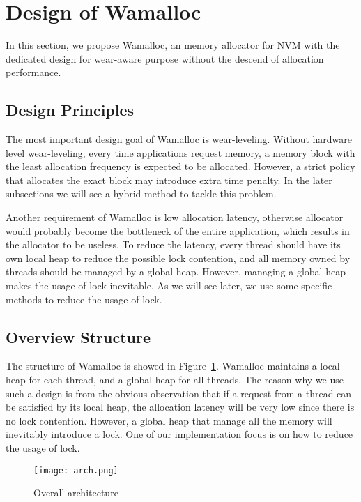 \documentclass[10pt, conference, compsocconf]{IEEEtran}
\begin{document}
\section{Design of Wamalloc}

In this section, we propose Wamalloc, 
an memory allocator for NVM with the dedicated design for wear-aware purpose 
without the descend of allocation performance.

\subsection{Design Principles}

The most important design goal of Wamalloc is wear-leveling. 
Without hardware level wear-leveling, every time applications request memory,
a memory block with the least allocation frequency is expected to be allocated.
However, a strict policy that allocates the exact block may introduce extra time penalty.
In the later subsections we will see a hybrid method to tackle this problem.

Another requirement of Wamalloc is low allocation latency,
otherwise allocator would probably become the bottleneck of the entire application,
which results in the allocator to be useless. 
To reduce the latency, every thread should have its own local heap to reduce the possible lock contention,
and all memory owned by threads should be managed by a global heap.
However, managing a global heap makes the usage of lock inevitable.
As we will see later, we use some specific methods to reduce the usage of lock.

\subsection{Overview Structure}

The structure of Wamalloc is showed in Figure~\ref{fig:arch}.
Wamalloc maintains a local heap for each thread, and a global heap for all threads.
The reason why we use such a design is from the obvious observation that if a request from a thread can be satisfied by its local heap,
the allocation latency will be very low since there is no lock contention.
However, a global heap that manage all the memory will inevitably introduce a lock.
One of our implementation focus is on how to reduce the usage of lock.

\begin{figure}
\centering
\texttt{[image: arch.png]}
\caption{Overall architecture}
\label{fig:arch}
\end{figure}
\end{document}
